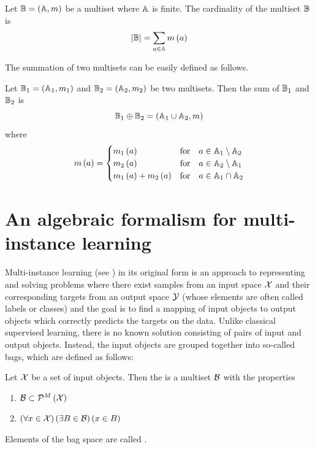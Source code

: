 \begin{define}
	Let \( \mathbb{B} = \left( \mathbb{A}, m \right) \) be a multiset where \( \mathbb{A} \) is finite. The cardinality of the multiset \( \mathbb{B} \) is
	\[ \left\lvert \mathbb{B} \right\rvert = \sum_{a \in \mathbb{A}} m \left( a \right) \]
\end{define}

The summation of two multisets can be easily defined as follows.

\begin{define}\label{def:multiset-sum}
	Let \( \mathbb{B}_1 = \left( \mathbb{A}_1, m_1 \right) \) and \( \mathbb{B}_2 = \left( \mathbb{A}_2, m_2 \right) \) be two multisets. Then the sum of \( \mathbb{B}_1 \) and \( \mathbb{B}_2 \) is
	\[ \mathbb{B}_1 \oplus \mathbb{B}_2 = \left( \mathbb{A}_1 \cup \mathbb{A}_2, m \right) \]
	where
	\[ m \left( a \right) = \begin{cases}
			m_1 \left( a \right) &\text{for} \quad a \in \mathbb{A}_1 \setminus \mathbb{A}_2 \\
			m_2 \left( a \right) &\text{for} \quad a \in \mathbb{A}_2 \setminus \mathbb{A}_1 \\
			m_1 \left( a \right) + m_2 \left( a \right) &\text{for} \quad a \in \mathbb{A}_1 \cap \mathbb{A}_2 \\
		\end{cases} \]
\end{define}

\section{An algebraic formalism for multi-instance learning}
Multi-instance learning (see \cite{dietterich_solving_1997}) in its original form is an approach to representing and solving problems where there exist samples from an input space \( \mathcal{X} \) and their corresponding targets from an output space \( \mathcal{Y} \) (whose elements are often called labels or classes) and the goal is to find a mapping of input objects to output objects which correctly predicts the targets on the data. Unlike classical supervised learning, there is no known solution consisting of pairs of input and output objects. Instead, the input objects are grouped together into so-called bags, which are defined as follows:

\begin{define}
	Let \( \mathcal{X} \) be a set of input objects. Then the  is a multiset \( \mathcal{B} \) with the properties
	\begin{enumerate}
		\item \( \mathcal{B} \subset \mathcal{P}^M \left( \mathcal{X} \right) \)
		\item \( \left( \forall x \in \mathcal{X} \right) \left( \exists B \in \mathcal{B} \right) \left( x \in B \right) \)
	\end{enumerate}
	Elements of the bag space are called .
\end{define}

